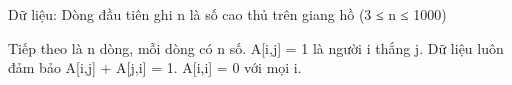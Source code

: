Dữ liệu:
Dòng đầu tiên ghi n là số cao thủ trên giang hồ (3 ≤ n ≤ 1000)  

   Tiếp theo là n dòng, mỗi dòng có n số. A[i,j] = 1 là người i thắng j. Dữ liệu luôn đảm bảo A[i,j] + A[j,i] = 1. A[i,i] = 0 với mọi i.